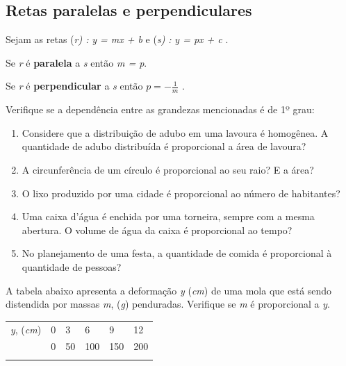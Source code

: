 \subsection{Retas paralelas e perpendiculares}

\begin{caixa}
Sejam as retas    (\textit{r) :}   \textit{y = mx + b}   e   (\textit{s) :}   \textit{y = px + c}    . 

Se \textit{r} é \textbf{paralela} a \textit{s} então  \textit{m = p}. 

Se \textit{r} é \textbf{perpendicular} a  \textit{s}  então \( p=-\frac{1}{m} \)   .
\end{caixa}

\begin{exercicios}
\exitem{} Verifique se a dependência entre as grandezas mencionadas é de 1º grau:

\begin{enumerate}[label=\alph*)]
	\item Considere que a distribuição de adubo em uma lavoura é homogênea. A quantidade de adubo distribuída é proporcional a área de lavoura?

	\item A circunferência de um círculo é proporcional ao seu raio? E a área?

	\item O lixo produzido por uma cidade é proporcional ao número de habitantes?

	\item Uma caixa d’água é enchida por uma torneira, sempre com a mesma abertura. O volume de água da caixa é proporcional ao tempo? 

	\item No planejamento de uma festa, a quantidade de comida é proporcional à quantidade de pessoas?
\end{enumerate}

\exitem{} A tabela abaixo apresenta a deformação \textit{y } (\textit{cm}) de uma mola que está sendo distendida por massas \textit{m}, (\textit{g}) penduradas. Verifique se \textit{m} é proporcional a \textit{y}. 

\begin{table}[H]
 			\centering
\begin{tabular}{p{0.49in}p{0.29in}p{0.29in}p{0.29in}p{0.29in}p{0.29in}}
\hline
\multicolumn{1}{|p{0.49in}}{\textit{y}, (\textit{cm})} & 
\multicolumn{1}{|p{0.29in}}{0} & 
\multicolumn{1}{|p{0.29in}}{3} & 
\multicolumn{1}{|p{0.29in}}{6} & 
\multicolumn{1}{|p{0.29in}}{9} & 
\multicolumn{1}{|p{0.29in}|}{12} \\
\hhline{------}
\multicolumn{1}{|p{0.49in}}{\textit{m} (\textit{g})} & 
\multicolumn{1}{|p{0.29in}}{0} & 
\multicolumn{1}{|p{0.29in}}{50} & 
\multicolumn{1}{|p{0.29in}}{100} & 
\multicolumn{1}{|p{0.29in}}{150} & 
\multicolumn{1}{|p{0.29in}|}{200} \\
\hhline{------}


\end{tabular}
\end{table}
\end{exercicios}
